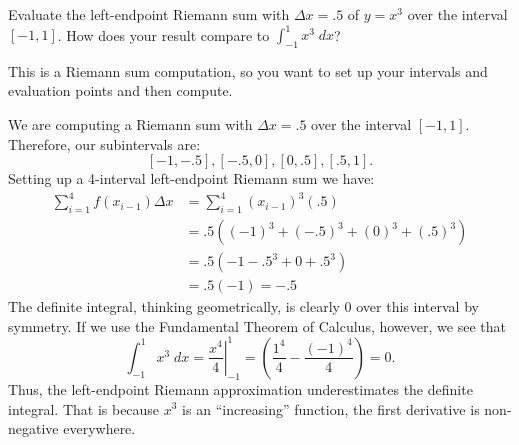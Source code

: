 \documentclass{ximera}
\author{Emma Smith Zbarsky}
\begin{document}
\begin{exercise}

Evaluate the left-endpoint Riemann sum with $\Delta x = .5$ of $y=x^3$
over the interval $[-1,1]$. How does your result compare to
$\int_{-1}^1 x^3 \; dx$?


\begin{hint}
This is a Riemann sum computation, so you want to set up your intervals
and evaluation points and then compute.
\end{hint}


\begin{hint}
We are computing a Riemann sum with $\Delta x = .5$ over the interval
$[-1,1]$. Therefore, our subintervals are:
\[[-1,-.5], [-.5,0], [0,.5], [.5, 1].\] Setting up a 4-interval
left-endpoint Riemann sum we have: \begin{align*}
\sum_{i=1}^4 f(x_{i-1}) \Delta x &= \sum_{i=1}^4 \left(x_{i-1}\right)^3 (.5) \\
&= .5\left((-1)^3+(-.5)^3+(0)^3+(.5)^3\right) \\
&= .5\left(-1-.5^3+0+.5^3\right) \\
&= .5(-1) = -.5
\end{align*} The definite integral, thinking geometrically, is clearly
0 over this interval by symmetry. If we use the Fundamental Theorem of
Calculus, however, we see that
\[\int_{-1}^1 x^3\; dx = \left.\frac{x^4}{4}\right|_{-1}^1 = \left(\frac{1^4}{4}-\frac{(-1)^4}{4}\right) = 0.\]
Thus, the left-endpoint Riemann approximation underestimates the
definite integral. That is because $x^3$ is an ``increasing'' function,
the first derivative is non-negative everywhere.
\end{hint}


\begin{multipleChoice}
\end{multipleChoice}

\end{exercise}
\end{document}
